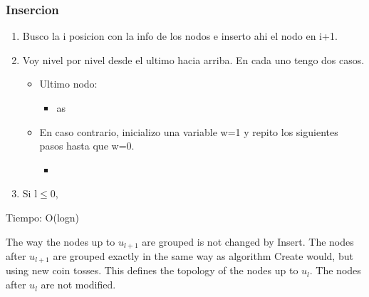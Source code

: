 \documentclass[10pt,handout]{beamer}
\begin{document}
\begin{frame}
\frametitle{Insercion}
  \begin{enumerate}
    \item  Busco la i posicion con la info de los nodos e inserto
  ahi el nodo en i+1.
  \item Voy nivel por nivel desde el ultimo hacia arriba.
  En cada uno tengo dos casos.
  \begin{itemize}
    \item Ultimo nodo:
      \begin{itemize}
        \item as
      \end{itemize}
    \item En caso contrario, inicializo una variable w=1 y repito los siguientes pasos hasta que w=0.
      \begin{itemize}
        \item
      \end{itemize}
  \end{itemize}
\item Si l$\leq$0,
\end{enumerate}
  Tiempo: O(logn)

  The way the nodes up to $u_{l+1}$ are grouped is not changed by Insert.
  The nodes after $u_{l+1}$ are grouped exactly in the same way as algorithm Create would,
  but using new coin tosses.
  This defines the topology of the nodes up to $u_l$.
  The nodes after $u_l$ are not modified.

\end{frame}

\end{document}
